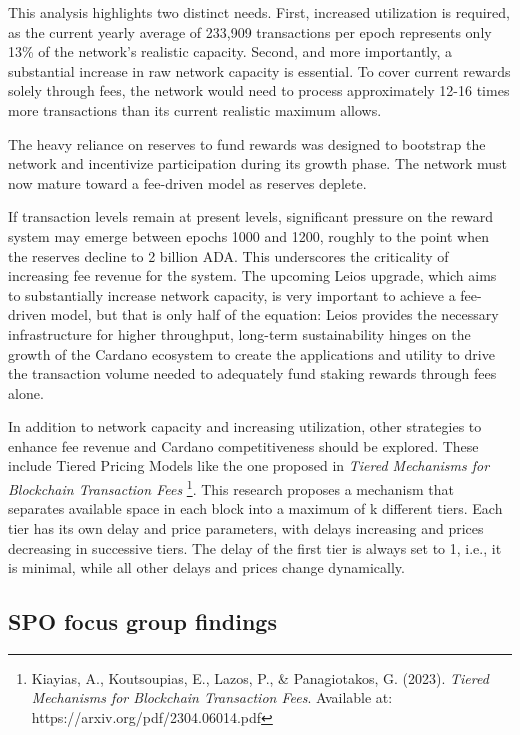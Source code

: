 \documentclass[11pt, letterpaper]{article}
\begin{document}
This analysis highlights two distinct needs. First, increased utilization is required, as the current yearly average of 233,909 transactions per epoch
represents only 13\% of the network's realistic capacity. Second, and more importantly, a substantial increase in raw network capacity is 
essential. To cover current rewards solely through fees, the network would need to process approximately 12-16 times more transactions than its 
current realistic maximum allows.

The heavy reliance on reserves to fund rewards was designed to bootstrap the network and incentivize participation during its growth phase. The network 
must now mature toward a fee-driven model as reserves deplete.

If transaction levels remain at present levels, significant pressure on the reward system may emerge between epochs 1000 and 1200, roughly 
to the point when the reserves decline to 2 billion ADA. This underscores the criticality of increasing fee revenue for the system. The upcoming Leios upgrade, 
which aims to substantially increase network capacity, is very important to achieve a fee-driven model, but that is only half of the equation: Leios 
provides the necessary infrastructure for higher throughput, long-term sustainability hinges on the growth of the Cardano ecosystem to create the 
applications and utility to drive the transaction volume needed to adequately fund staking rewards through fees alone. 

In addition to network capacity and increasing utilization, other strategies to enhance fee revenue and Cardano competitiveness should be explored. These include
Tiered Pricing Models like the one proposed in \emph{Tiered Mechanisms for Blockchain Transaction Fees} \footnote{Kiayias, A., Koutsoupias, E., Lazos, P., 
\& Panagiotakos, G. (2023). \emph{Tiered Mechanisms for Blockchain Transaction Fees}. Available at: https://arxiv.org/pdf/2304.06014.pdf}. This research 
proposes a mechanism that separates available space in each block into a maximum of k different tiers. Each tier has its own delay and price parameters, 
with delays increasing and prices decreasing in successive tiers. The delay of the first tier is always set to 1, i.e., it is minimal, while all other 
delays and prices change dynamically.

\subsection{SPO focus group findings}
\end{document}
